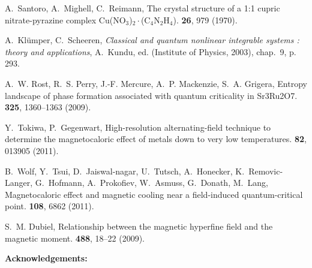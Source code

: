 \documentclass[12pt]{article}
\begin{document}
\begin{thebibliography}{10}
A.~Santoro, A.~Mighell, C.~Reimann, {The crystal structure of a 1:1 cupric
  nitrate-pyrazine complex Cu(NO$_3$)$_2\cdot$(C$_4$N$_2$H$_4$)}.
 {\bf 26}, 979 (1970).

A.~Kl{\"{u}}mper, C.~Scheeren, {\it Classical and quantum nonlinear integrable
  systems : theory and applications\/}, A.~Kundu, ed. (Institute of Physics,
  2003), chap.~9, p. 293.

A.~W. Rost, R.~S. Perry, J.-F. Mercure, A.~P. Mackenzie, S.~A. Grigera,
  {Entropy landscape of phase formation associated with quantum criticality in
  Sr3Ru2O7.}
 {\bf 325}, 1360--1363 (2009).

Y.~Tokiwa, P.~Gegenwart, {High-resolution alternating-field technique to
  determine the magnetocaloric effect of metals down to very low temperatures.}
 {\bf 82}, 013905 (2011).

B.~Wolf, Y.~Tsui, D.~Jaiswal-nagar, U.~Tutsch, A.~Honecker, K.~Removic-Langer,
  G.~Hofmann, A.~Prokofiev, W.~Asmuss, G.~Donath, M.~Lang, {Magnetocaloric
  effect and magnetic cooling near a field-induced quantum-critical point}.
 {\bf 108},
  6862 (2011).

S.~M. Dubiel, {Relationship between the magnetic hyperfine field and the
  magnetic moment}.
 {\bf 488}, 18--22 (2009).

\end{thebibliography}





\noindent \textbf{Acknowledgements:} 
\end{document}
